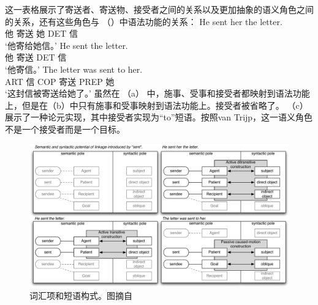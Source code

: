 这一表格展示了寄送者、寄送物、接受者之间的关系以及更加抽象的语义角色之间的关系，还有这些角色与 （）中语法功能的关系：
\eal
\ex 
\gll He sent her the letter.\\
     他 寄送 她 DET 信\\
\glt `他寄给她信。'
\ex 
\gll He sent the letter.\\
     他 寄送 DET 信\\
\glt `他寄信。'
\ex 
\gll The letter was sent to her.\\
     ART 信 COP 寄送 PREP 她\\
\glt `这封信被寄送给她了。'
\zl
虽然在 （a） 中，施事、受事和接受者都映射到语法功能上，但是在（b）中只有施事和受事映射到语法功能上。接受者被省略了。 （c）展示了一种论元实现，其中接受者实现为“to”短语。按照van Trijp，这一语义角色不是一个接受者而是一个目标。

\begin{figure}
\includegraphics[width=\textwidth]{Figures/2011-van-Trijp.pdf}
\caption{\label{fig-as-trijp}词汇项和短语构式。图摘自}
\end{figure}%

